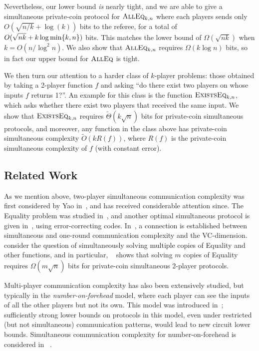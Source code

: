 Nevertheless, our lower bound \emph{is} nearly tight, and we are able to give a simultaneous private-coin protocol for $\text{\textsc{AllEq}}_{k,n}$ where each players sends only $O(\sqrt{n/k} + \log(k))$ bits to the referee,
for a total of $O(\sqrt{nk}+ k \log \min \{  k, n \})$ bits.
This matches the lower bound of $\Omega(\sqrt{nk})$ when $k = O(n/\log^2 n)$.
We also show that $\text{\textsc{AllEq}}_{k,n}$ requires $\Omega(k \log n)$ bits, so in fact our upper bound for $\text{\textsc{AllEq}}$ is tight.

We then turn our attention to a harder class of $k$-player problems: those obtained by taking a 2-player function $f$ and asking ``do there exist two players on whose inputs $f$ returns 1?''. An example for this class is the function $\text{\textsc{ExistsEq}}_{k,n}$, which asks whether there exist two players that received the same input. We show that $\text{\textsc{ExistsEq}}_{k,n}$ requires $\tilde{\Theta}(k\sqrt{n})$ bits for private-coin simultaneous protocols, and moreover, any function in the class above has private-coin simultaneous complexity $\tilde{O}(k R(f))$, where $R(f)$ is the private-coin simultaneous complexity of $f$ (with constant error).

\subsection{Related Work}
As we mention above, two-player simultaneous communication complexity was first considered by Yao in~\cite{Yao79},
and has received considerable attention since.
The Equality problem was studied in~\cite{BK97,NS96,BW96}, and another optimal simultaneous protocol is given in~\cite{Amb96},
using error-correcting codes.
In~\cite{KNR95}, a connection is established between simultaneous and one-round communication complexity and the VC-dimension.
\cite{CSWY01,JK09} consider the question of simultaneously solving multiple copies of Equality and other functions,
and in particular, ~\cite{CSWY01} shows that solving $m$ copies of Equality requires $\Omega(m \sqrt{n})$ bits for private-coin simultaneous 2-player protocols.

Multi-player communication complexity has also been extensively studied, but typically in the \emph{number-on-forehead} model, where each player can see the inputs of all the other players but not its own. This model was introduced in~\cite{CFL83}; sufficiently strong lower bounds on protocols in this model, even under restricted (but not simultaneous) communication patterns, would lead to new circuit lower bounds.
Simultaneous communication complexity for number-on-forehead is considered in ~\cite{BGKL04}.

